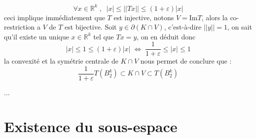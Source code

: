 \documentclass[12pt]{article}
\begin{document}
\begin{enumerate}
	\begin{equation*}
	\forall x \in \mathbb{R}^k \; , \;\; |x|\leq ||Tx||\leq (1+\varepsilon)|x|
	\end{equation*}
	ceci implique immédiatement que $T$ est injective, notons $V=\text{Im}T$, alors la co-restriction a $V$ de $T$ est bijective.
	Soit $y\in \partial(K\cap V)$, c'est-à-dire $||y||=1$, on sait qu'il existe un unique $x\in\mathbb{R}^k$ tel que $Tx=y$, on en déduit donc 
	\begin{equation*}
	|x|\leq 1 \leq (1+\varepsilon)|x|\; \iff\; \frac{1}{1+\varepsilon}\leq|x|\leq 1
	\end{equation*}
	la convexité et la symétrie centrale de $K\cap V$ nous permet de conclure que  :
	\begin{equation*}
		\frac{1}{1+\varepsilon}T(B_2^k)\subset K\cap V \subset T(B_2^k)
	\end{equation*}
\begin{center}\huge\color{red}...\color{black}\end{center}
\end{enumerate}
\section{Existence du sous-espace}
\end{document}
